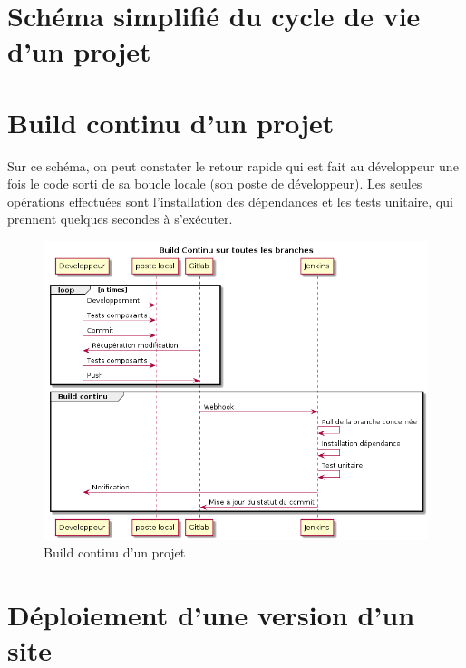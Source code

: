 \section{Schéma simplifié du cycle de vie d'un projet}

\clearpage
\section{Build continu d'un projet \naq}

Sur ce schéma, on peut constater le retour rapide qui est fait au développeur une fois le code sorti de sa boucle locale (son poste de développeur). Les seules opérations effectuées sont l'installation des dépendances et les tests unitaire, qui prennent quelques secondes à s'exécuter.

\begin{figure}[ht]
	\centering
	\includegraphics[scale=0.6,angle=-90]{img/build-continu.png}
	\caption{Build continu d'un projet \naq}
	\label{annexe:build-continu}
\end{figure}

\clearpage
\section{Déploiement d'une version d'un site \naq}

